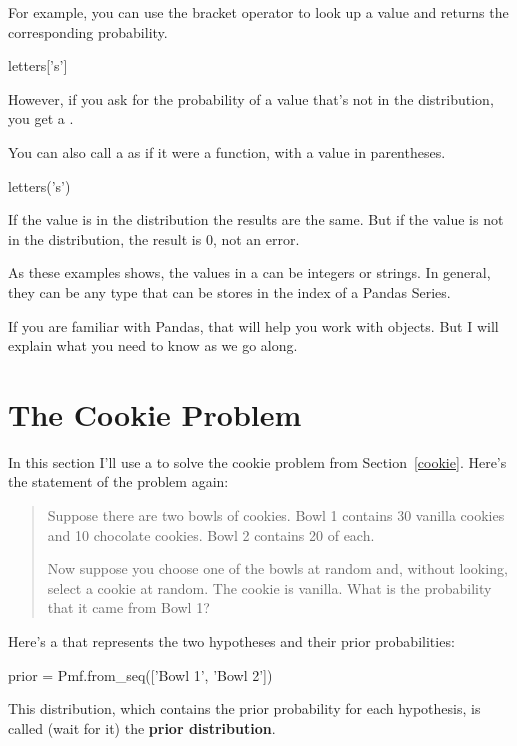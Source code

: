 \documentclass[12pt]{book}
\theoremstyle{exercise}
\begin{document}
For example, you can use the bracket operator to look up a value and returns the corresponding probability.

\begin{code}
letters['s']
\end{code}

However, if you ask for the probability of a value that's not in the distribution, you get a .

You can also call a  as if it were a function, with a value in parentheses.

\begin{code}
letters('s')
\end{code}

If the value is in the distribution the results are the same.
But if the value is not in the distribution, the result is $0$, not an error.

As these examples shows, the values in a  can be integers or strings.
In general, they can be any type that can be stores in the index of a Pandas Series.

If you are familiar with Pandas, that will help you work with  objects.
But I will explain what you need to know as we go along.


\section{The Cookie Problem}

In this section I'll use a  to solve the cookie problem from Section~\ref{cookie}.
Here's the statement of the problem again:

\begin{quote}
Suppose there are two bowls of cookies.  
Bowl 1 contains 30 vanilla cookies and 10 chocolate cookies.  
Bowl 2 contains 20 of each.

Now suppose you choose one of the bowls at random and, without
looking, select a cookie at random.  The cookie is vanilla.  What is
the probability that it came from Bowl 1?
\end{quote}


Here's a  that represents the two hypotheses and their prior probabilities:

\begin{code}
prior = Pmf.from_seq(['Bowl 1', 'Bowl 2'])

\end{code}

This distribution, which contains the prior probability for each hypothesis,
is called (wait for it) the {\bf prior distribution}.
\end{document}
